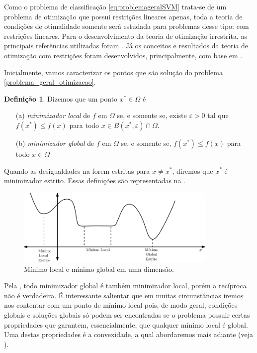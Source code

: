\documentclass[12pt,a4paper]{scrartcl}
\theoremstyle{definition}%
\newtheorem{defi}{Definição}
\begin{document}
Como o problema de classificação \eqref{eq:problemageralSVM} trata-se de um problema de otimização que possui restrições lineares apenas, toda a teoria de condições de otimalidade somente será estudada para problemas desse tipo: com restrições lineares. Para o desenvolvimento da teoria de otimização irrestrita, as principais referências utilizadas foram \textcite{Izmailov2014ac,Ademir2013}. Já os conceitos e resultados da teoria de otimização com restrições foram desenvolvidos, principalmente, com base em \textcite{Ana1994,luenberger2008linear}.  

Inicialmente, vamos caracterizar os pontos que são solução do problema \eqref{problema_geral_otimizacao}.

\begin{defi} \label{defi:minimizador_local_global}
Dizemos que um ponto $x^{*} \in \Omega$ é
\begin{enumerate}
	\item[(a)] \emph{minimizador local} de $f$ em $\Omega$ se, e somente se, existe $\varepsilon >0$ tal que $f(x^{*}) \leq f(x)$ para todo $x \in B(x^{*}, \varepsilon) \cap \Omega$.

	\item[(b)] \emph{minimizador global} de $f$ em $\Omega$ se, e somente se, $f(x^{*}) \leq f(x)$ para todo $x \in \Omega$
\end{enumerate} 
\end{defi}

Quando as desigualdades na  forem estritas para $x \neq x^{*}$, diremos que $x^{*}$ é minimizador estrito. Essas definições são representadas na .

\begin{figure}[!ht] 
	\centering
	\includegraphics[width=0.86\textwidth]{grafico_minimo_local_global}
	\caption{ Mínimo local e mínimo global em uma dimensão. \label{fig:grafico_minimo_local_global}}
\end{figure}

Pela , todo minimizador global é também minimizador local, porém a recíproca não é verdadeira. É interessante salientar que em muitas circunstâncias iremos nos contentar com um ponto de mínimo local pois, de modo geral, condições globais e soluções globais só podem ser encontradas se o problema possuir certas propriedades que garantem, essencialmente, que qualquer mínimo local é global. Uma destas propriedades é a convexidade, a qual abordaremos mais adiante (veja ).
\end{document}
